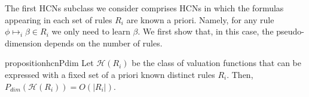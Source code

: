 \documentclass[letterpaper]{article} %
\newcommand{\modulus}[1]{\vert #1 \vert}
\newcommand{\hclass}{\ensuremath{\mathcal{H}}}
\begin{document}
The first HCNs subclass we consider comprises HCNs in which the formulas appearing in each set of rules $R_i$ are known a priori. Namely, for any rule $\phi \mapsto_i \beta \in R_i$ we only need to learn $\beta$.
We first show that, in this case, the pseudo-dimension depends on the number of rules.
\begin{restatable}{proposition}{hcnPdim}\label{lem:hcn_pdim}
Let $\hclass(R_i)$ be the class of valuation functions that can be expressed with a fixed set of a priori known distinct rules $R_i$. Then,
$P_{dim}\left(\hclass(R_i)\right) = O\left(\modulus{R_i}\right)$.
\end{restatable}
\end{document}
